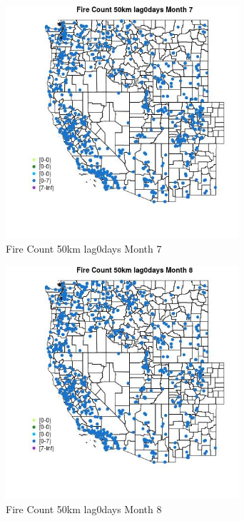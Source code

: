 \begin{figure} 
\centering  
\includegraphics[width=0.77\textwidth]{Code_Outputs/Report_ML_input_PM25_Step4_part_e_de_duplicated_aves_compiled_2019-05-21wNAs_MapObsMo7Fire_Count_50km_lag0days.jpg} 
\caption{\label{fig:Report_ML_input_PM25_Step4_part_e_de_duplicated_aves_compiled_2019-05-21wNAsMapObsMo7Fire_Count_50km_lag0days}Fire Count 50km lag0days Month 7} 
\end{figure} 
 

\begin{figure} 
\centering  
\includegraphics[width=0.77\textwidth]{Code_Outputs/Report_ML_input_PM25_Step4_part_e_de_duplicated_aves_compiled_2019-05-21wNAs_MapObsMo8Fire_Count_50km_lag0days.jpg} 
\caption{\label{fig:Report_ML_input_PM25_Step4_part_e_de_duplicated_aves_compiled_2019-05-21wNAsMapObsMo8Fire_Count_50km_lag0days}Fire Count 50km lag0days Month 8} 
\end{figure} 
 


